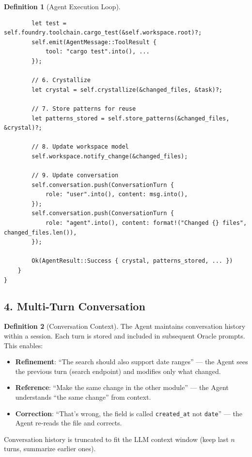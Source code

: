 \documentclass[11pt,a4paper,twoside]{article}
\theoremstyle{definition}
\newtheorem{definition}{Definition}[section]
\theoremstyle{remark}
\begin{document}
\begin{definition}[Agent Execution Loop]
\begin{lstlisting}
        let test = self.foundry.toolchain.cargo_test(&self.workspace.root)?;
        self.emit(AgentMessage::ToolResult {
            tool: "cargo test".into(), ...
        });

        // 6. Crystallize
        let crystal = self.crystallize(&changed_files, &task)?;

        // 7. Store patterns for reuse
        let patterns_stored = self.store_patterns(&changed_files, &crystal)?;

        // 8. Update workspace model
        self.workspace.notify_change(&changed_files);

        // 9. Update conversation
        self.conversation.push(ConversationTurn {
            role: "user".into(), content: msg.into(),
        });
        self.conversation.push(ConversationTurn {
            role: "agent".into(), content: format!("Changed {} files", changed_files.len()),
        });

        Ok(AgentResult::Success { crystal, patterns_stored, ... })
    }
}
\end{lstlisting}
\end{definition}


\subsection{4. Multi-Turn Conversation}\label{sec:multiturn}

\begin{definition}[Conversation Context]\label{def:conversation}
The Agent maintains conversation history within a session. Each
turn is stored and included in subsequent Oracle prompts. This
enables:

\begin{itemize}[nosep]
  \item \textbf{Refinement}: ``The search should also support date
        ranges'' --- the Agent sees the previous turn (search endpoint)
        and modifies only what changed.
  \item \textbf{Reference}: ``Make the same change in the other module''
        --- the Agent understands ``the same change'' from context.
  \item \textbf{Correction}: ``That's wrong, the field is called
        \texttt{created\_at} not \texttt{date}'' --- the Agent re-reads
        the file and corrects.
\end{itemize}

Conversation history is truncated to fit the LLM context window
(keep last $n$ turns, summarize earlier ones).
\end{definition}
\end{document}
